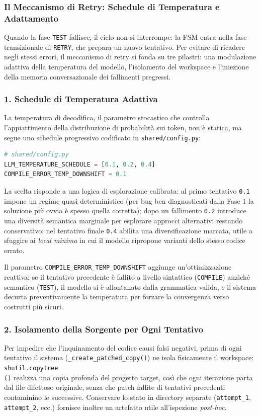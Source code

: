 \subsubsection{Il Meccanismo di Retry: Schedule di Temperatura e Adattamento}
\label{subsubsec:3.4.2.6}
Quando la fase \texttt{TEST} fallisce, il ciclo non si interrompe: la FSM entra
nella fase transizionale di \texttt{RETRY}, che prepara un nuovo tentativo. Per
evitare di ricadere negli stessi errori, il meccanismo di retry si fonda su tre
pilastri: una modulazione adattiva della temperatura del modello, l'isolamento
del workspace e l'iniezione della memoria conversazionale dei fallimenti pregressi.

\subsubsection{1. Schedule di Temperatura Adattiva}
La temperatura di decodifica, il parametro stocastico che controlla l'appiattimento della distribuzione di
probabilità sui token, non è statica, ma segue uno schedule progressivo codificato in \texttt{shared/config.py}:

\begin{lstlisting}[language=Python, label={lst:temp_schedule}]
# shared/config.py
LLM_TEMPERATURE_SCHEDULE = [0.1, 0.2, 0.4]
COMPILE_ERROR_TEMP_DOWNSHIFT = 0.1
\end{lstlisting}

La scelta risponde a una logica di esplorazione calibrata: al primo tentativo \texttt{0.1} impone un regime quasi
deterministico (per bug ben diagnosticati dalla Fase 1 la soluzione più ovvia è spesso quella corretta); dopo un
fallimento \texttt{0.2} introduce una diversità semantica marginale per esplorare approcci alternativi restando
conservativo; nel tentativo finale \texttt{0.4} abilita una diversificazione marcata, utile a sfuggire ai
\textit{local minima} in cui il modello ripropone varianti dello stesso codice errato.

Il parametro \texttt{COMPILE\_ERROR\_TEMP\_DOWNSHIFT} aggiunge un'ottimizzazione reattiva: se il tentativo
precedente è fallito a livello sintattico (\texttt{COMPILE}) anziché semantico (\texttt{TEST}), il modello si è
allontanato dalla grammatica valida, e il sistema decurta preventivamente la temperatura per forzare la
convergenza verso costrutti più sicuri.

\subsubsection{2. Isolamento della Sorgente per Ogni Tentativo}
Per impedire che l'inquinamento del codice causi falsi negativi, prima di ogni tentativo il sistema
(\texttt{\_create\_patched\_copy()}) ne isola fisicamente il workspace: \texttt{shutil.copytree\\()} realizza una copia
profonda del progetto target, così che ogni iterazione parta dal file difettoso originale, senza che patch fallite
di tentativi precedenti contaminino le successive. Conservare lo stato in directory separate (\texttt{attempt\_1},
\texttt{attempt\_2}, ecc.) fornisce inoltre un artefatto utile all'ispezione \textit{post-hoc}.

